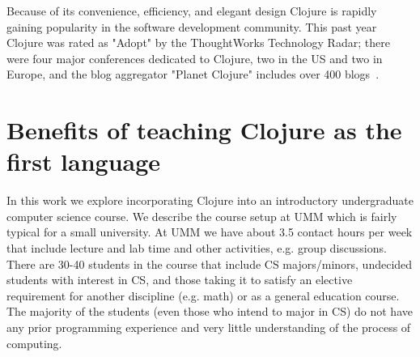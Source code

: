 \documentclass[submission,copyright,creativecommons]{eptcs}
\newcommand{\allcomments}[1]{{#1}}
\newcommand{\elenacomment}[1]{{\bf \textcolor{ForestGreen}{\allcomments{{#1}}}}}
\newcommand{\stephencomment}[1]{{\bf \color{StephensBlue}{\allcomments{{#1}}}}} %
\newcommand{\joecomment}[1]{{\bf \color{JoesGold}{\allcomments{{#1}}}}}
\begin{document}
Because of its convenience, efficiency, and elegant design 
Clojure is rapidly gaining popularity in the software development community. This past year Clojure was rated as "Adopt" by the ThoughtWorks Technology Radar; there were four major conferences dedicated to Clojure, two in the US and two in Europe, and the blog aggregator "Planet Clojure" includes over 400 blogs~\cite{clojure:review}. 

\section{Benefits of teaching Clojure as the first language}\label{sec:benefits}

In this work we explore incorporating Clojure into an introductory undergraduate computer science course. We describe the course setup at UMM which is fairly typical for a small university. At UMM we have about 3.5 contact hours per week that include lecture and lab time and other activities, e.g. group discussions. There are 30-40 students in the course that  include CS majors/minors, undecided students with  interest in CS, and those taking it to satisfy an elective requirement for another discipline (e.g. math) or as a general education course. The majority of the students (even those who intend to major in CS) do not have any prior programming experience and very little understanding of the process of computing. 
\end{document}
